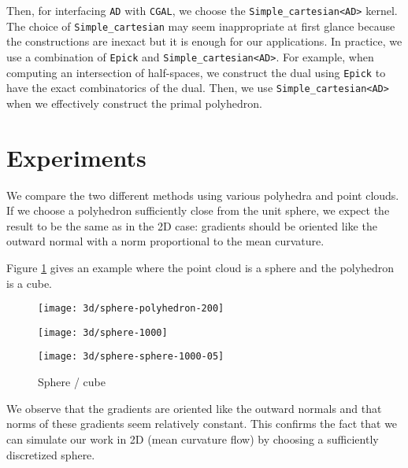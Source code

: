 Then, for interfacing \texttt{AD} with \texttt{CGAL}, we choose the
\texttt{Simple\_cartesian<AD>} kernel. The choice of \texttt{Simple\_cartesian}
may seem inappropriate at first glance because the constructions are inexact but
it is enough for our applications. In practice, we use a combination of
\texttt{Epick} and \texttt{Simple\_cartesian<AD>}. For example, when computing
an intersection of half-spaces, we construct the dual using \texttt{Epick} to
have the exact combinatorics of the dual. Then, we use
\texttt{Simple\_cartesian<AD>} when we effectively construct the primal
polyhedron.

\section{Experiments}


We compare the two different methods using various polyhedra and point clouds.
If we choose a polyhedron sufficiently close from the unit sphere, we expect the
result to be the same as in the 2D case: gradients should be oriented like the
outward normal with a norm proportional to the mean curvature.

Figure \ref{fig:3d-mean-curvature-sphere-cube} gives an example where the point
cloud is a sphere and the polyhedron is a cube.

\begin{figure}[h]
    \centering
    \begin{minipage}{0.32\linewidth}
        \centering
        \texttt{[image: 3d/sphere-polyhedron-200]}
    \end{minipage}
    \begin{minipage}{0.32\linewidth}
        \centering
        \texttt{[image: 3d/sphere-1000]}
    \end{minipage}
    \begin{minipage}{0.32\linewidth}
        \centering
        \texttt{[image: 3d/sphere-sphere-1000-05]}
    \end{minipage}
    \caption{Sphere / cube}
    \label{fig:3d-mean-curvature-sphere-cube}
\end{figure}

We observe that the gradients are oriented like the outward normals and that
norms of these gradients seem relatively constant. This confirms the fact that
we can simulate our work in 2D (mean curvature flow) by choosing a sufficiently
discretized sphere.

